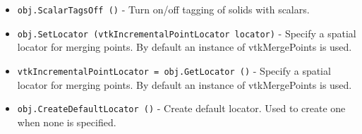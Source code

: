 \begin{itemize}
\item  \verb|obj.ScalarTagsOff ()| -  Turn on/off tagging of solids with scalars.

\item  \verb|obj.SetLocator (vtkIncrementalPointLocator locator)| -  Specify a spatial locator for merging points. By
 default an instance of vtkMergePoints is used.

\item  \verb|vtkIncrementalPointLocator = obj.GetLocator ()| -  Specify a spatial locator for merging points. By
 default an instance of vtkMergePoints is used.

\item  \verb|obj.CreateDefaultLocator ()| -  Create default locator. Used to create one when none is specified.

\end{itemize}
